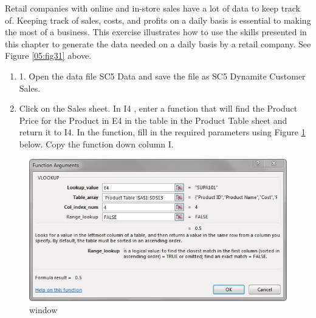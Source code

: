 Retail companies with online and in-store sales have a lot of data to keep track of. Keeping track of sales, costs, and profits on a daily basis is essential to making the most of a business. This exercise illustrates how to use the skills presented in this chapter to generate the data needed on a daily basis by a retail company. See Figure \ref{05:fig31} above.

\begin{enumerate}
	\item 1. Open the data file SC5 Data and save the file as SC5 Dynamite Customer Sales.
	\item Click on the Sales sheet. In I4 , enter a  function that will find the Product Price for the Product in E4 in the table in the Product Table sheet and return it to I4. In the  function, fill in the required parameters using Figure \ref{05:fig32} below. Copy the  function down column I.
\end{enumerate}

\begin{figure}[H]
	\centering
	\includegraphics[width=\maxwidth{.95\linewidth}]{gfx/ch05_fig32}
	\caption{ window}
	\label{05:fig32}
\end{figure}

